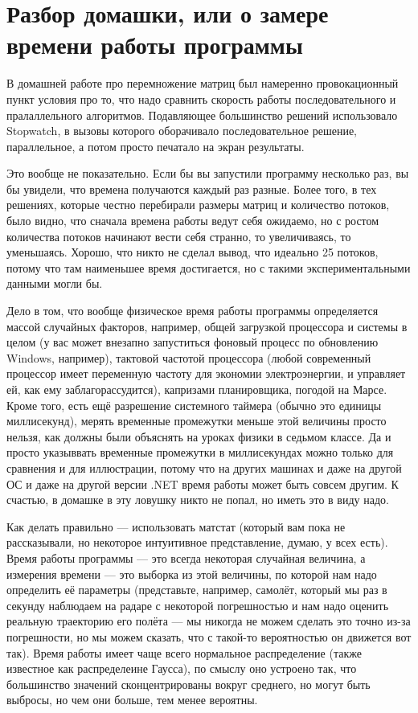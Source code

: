 \documentclass{../../text-style}
\begin{document}
\maketitle
\thispagestyle{empty}

\section{Разбор домашки, или о замере времени работы программы}

В домашней работе про перемножение матриц был намеренно провокационный пункт условия про то, что надо сравнить скорость работы последовательного и пралаллельного алгоритмов. Подавляющее большинство решений использовало Stopwatch, в вызовы которого оборачивало последовательное решение, параллельное, а потом просто печатало на экран результаты.

Это вообще не показательно. Если бы вы запустили программу несколько раз, вы бы увидели, что времена получаются каждый раз разные. Более того, в тех решениях, которые честно перебирали размеры матриц и количество потоков, было видно, что сначала времена работы ведут себя ожидаемо, но с ростом количества потоков начинают вести себя странно, то увеличиваясь, то уменьшаясь. Хорошо, что никто не сделал вывод, что идеально 25 потоков, потому что там наименьшее время достигается, но с такими экспериментальными данными могли бы.

Дело в том, что вообще физическое время работы программы определяется массой случайных факторов, например, общей загрузкой процессора и системы в целом (у вас может внезапно запуститься фоновый процесс по обновлению Windows, например), тактовой частотой процессора (любой современный процессор имеет переменную частоту для экономии электроэнергии, и управляет ей, как ему заблагорассудится), капризами планировщика, погодой на Марсе. Кроме того, есть ещё разрешение системного таймера (обычно это единицы миллисекунд), мерять временные промежутки меньше этой величины просто нельзя, как должны были объяснять на уроках физики в седьмом классе. Да и просто указыввать временные промежутки в миллисекундах можно только для сравнения и для иллюстрации, потому что на других машинах и даже на другой ОС и даже на другой версии .NET время работы может быть совсем другим. К счастью, в домашке в эту ловушку никто не попал, но иметь это в виду надо.

Как делать правильно --- использовать матстат (который вам пока не рассказывали, но некоторое интуитивное представление, думаю, у всех есть). Время работы программы --- это всегда некоторая случайная величина, а измерения времени --- это выборка из этой величины, по которой нам надо определить её параметры (представьте, например, самолёт, который мы раз в секунду наблюдаем на радаре с некоторой погрешностью и нам надо оценить реальную траекторию его полёта --- мы никогда не можем сделать это точно из-за погрешности, но мы можем сказать, что с такой-то вероятностью он движется вот так). Время работы имеет чаще всего нормальное распределение (также известное как распределеине Гаусса), по смыслу оно устроено так, что большинство значений сконцентрированы вокруг среднего, но могут быть выбросы, но чем они больше, тем менее вероятны. 
\end{document}
